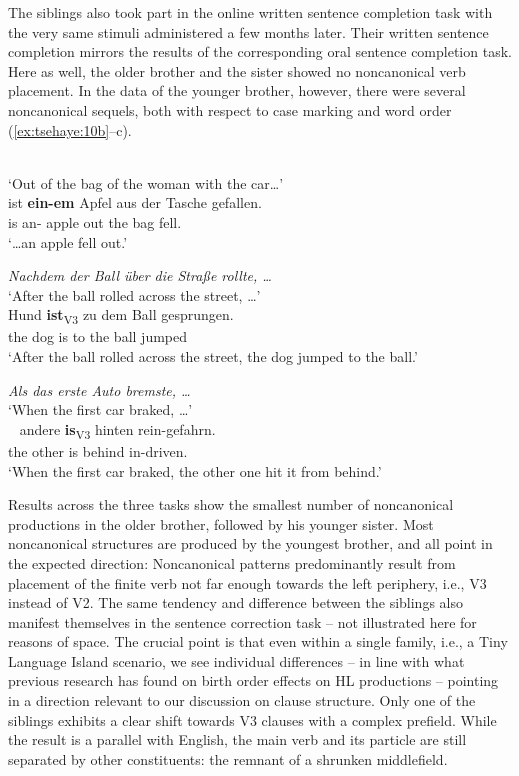 \documentclass[output=paper]{langscibook}
\begin{document}
The siblings also took part in the online written sentence completion task with the very same stimuli administered a few months later. Their written sentence completion mirrors the results of the corresponding oral sentence completion task. Here as well, the older brother and the sister showed no noncanonical verb placement. In the data of the younger brother, however, there were several noncanonical sequels, both with respect to case marking  and word order (\ref{ex:tsehaye:10b}--c).

\ea%
    \label{ex:tsehaye:10}
    
\label{ex:tsehaye:10a}\\
	 ‘Out of the bag of the woman with the car…’\\
\gll ist \textbf{{ein-em}} {Apfel} {aus} {der} {Tasche} {gefallen.}\\
	 is {an}-\Dat{} apple out the bag fell.\\
\glt ‘…an apple fell out.’

\ex \textit{Nachdem der Ball über die Straße rollte, …} \label{ex:tsehaye:10b}\\
	 ‘After the ball rolled across the street, …’\\
 {Hund} {\textbf{ist}\textsubscript{V3}} {zu} {dem} {Ball} {gesprungen.}\\
	 the dog {is} to the ball jumped\\
\glt ‘After the ball rolled across the street, the dog jumped to the ball.’

\ex \textit{Als das erste Auto bremste, …}\label{ex:tsehaye:10c}\\
	 ‘When the first car braked, …’\\\
 {andere} {\textbf{is}\textsubscript{V3}} {hinten} {rein-gefahrn.}\\
	  the other {is} behind in-driven.\\
\glt ‘When the first car braked, the other one hit it from behind.’
\z
\z

Results across the three tasks show the smallest number of noncanonical productions in the older brother, followed by his younger sister. Most noncanonical structures are produced by the youngest brother, and all point in the expected direction: Noncanonical patterns predominantly result from placement of the finite verb not far enough towards the left periphery, i.e., V3 instead of V2. The same tendency and difference between the siblings also manifest themselves in the sentence correction task – not illustrated here for reasons of space. The crucial point is that even within a single family, i.e., a Tiny Language Island scenario, we see individual differences – in line with what previous research has found on birth order effects on HL productions – pointing in a direction relevant to our discussion on clause structure. Only one of the siblings exhibits a clear shift towards V3 clauses with a complex prefield. While the result is a parallel with English, the main verb and its particle are still separated by other constituents: the remnant of a shrunken middlefield.
\end{document}
